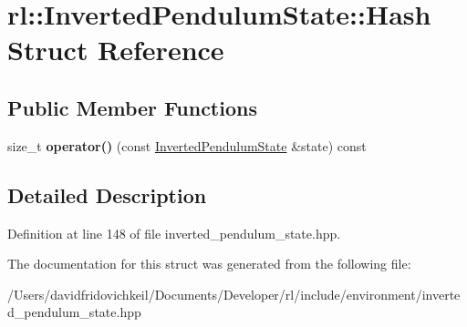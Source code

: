 \hypertarget{structrl_1_1_inverted_pendulum_state_1_1_hash}{}\section{rl\+:\+:Inverted\+Pendulum\+State\+:\+:Hash Struct Reference}
\label{structrl_1_1_inverted_pendulum_state_1_1_hash}
\subsection*{Public Member Functions}
\begin{DoxyCompactItemize}
\item 
\hypertarget{structrl_1_1_inverted_pendulum_state_1_1_hash_a434908dd0edd9f5445fdd5f397be1149}{}\label{structrl_1_1_inverted_pendulum_state_1_1_hash_a434908dd0edd9f5445fdd5f397be1149} 
size\+\_\+t {\bfseries operator()} (const \hyperlink{structrl_1_1_inverted_pendulum_state}{Inverted\+Pendulum\+State} \&state) const
\end{DoxyCompactItemize}


\subsection{Detailed Description}


Definition at line 148 of file inverted\+\_\+pendulum\+\_\+state.\+hpp.



The documentation for this struct was generated from the following file\+:\begin{DoxyCompactItemize}
\item 
/\+Users/davidfridovichkeil/\+Documents/\+Developer/rl/include/environment/inverted\+\_\+pendulum\+\_\+state.\+hpp\end{DoxyCompactItemize}
